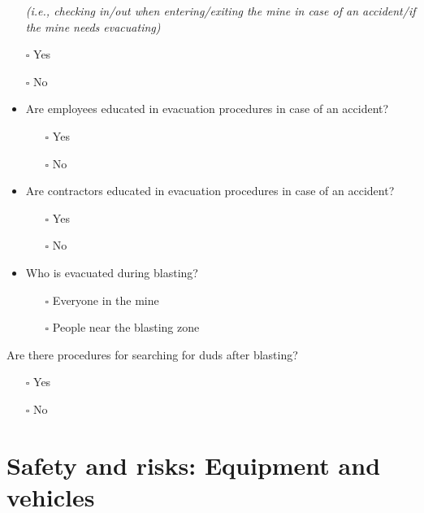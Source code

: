 \documentclass[
  12pt,
]{scrbook}
\providecommand{\tightlist}{%
  \setlength{\itemsep}{0pt}\setlength{\parskip}{0pt}}
\begin{document}
\begin{itemize}
  \emph{(i.e., checking in/out when entering/exiting the mine in case of an accident/if the mine needs evacuating)}
\item[$\square$]
  Yes
\item[$\square$]
  No
\item
  Are employees educated in evacuation procedures in case of an accident?

  \begin{itemize}
  \tightlist
  \item[$\square$]
    Yes
  \item[$\square$]
    No
  \end{itemize}
\item
  Are contractors educated in evacuation procedures in case of an accident?

  \begin{itemize}
  \tightlist
  \item[$\square$]
    Yes
  \item[$\square$]
    No
  \end{itemize}
\item
  Who is evacuated during blasting?

  \begin{itemize}
  \tightlist
  \item[$\square$]
    Everyone in the mine
  \item[$\square$]
    People near the blasting zone
  \end{itemize}
\end{itemize}

Are there procedures for searching for duds after blasting?

\begin{itemize}
\tightlist
\item[$\square$]
  Yes
\item[$\square$]
  No
\end{itemize}

\hypertarget{safety-and-risks-equipment-and-vehicles}{%
\section*{Safety and risks: Equipment and vehicles}\label{safety-and-risks-equipment-and-vehicles}}
\end{document}
